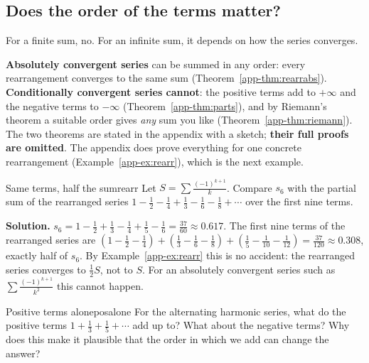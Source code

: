 \documentclass[11pt]{article}
\begin{document}
\subsection*{Does the order of the terms matter?}

For a finite sum, no. For an infinite sum, it depends on how the series converges.

\begin{remark}
\textbf{Absolutely convergent series} can be summed in any order: every rearrangement converges to the same sum (Theorem~\ref{app-thm:rearrabs}). \textbf{Conditionally convergent series cannot}: the positive terms add to $+\infty$ and the negative terms to $-\infty$ (Theorem~\ref{app-thm:parts}), and by Riemann's theorem a suitable order gives \emph{any} sum you like (Theorem~\ref{app-thm:riemann}). The two theorems are stated in the appendix with a sketch; \textbf{their full proofs are omitted}. The appendix does prove everything for one concrete rearrangement (Example~\ref{app-ex:rearr}), which is the next example.
\end{remark}

\begin{exmp}{Same terms, half the sum}{rearr}
Let $S=\sum\frac{(-1)^{k+1}}k$. Compare $s_6$ with the partial sum of the rearranged series $1-\frac12-\frac14+\frac13-\frac16-\frac18+\cdots$ over the first nine terms.

\textbf{Solution.} $s_6=1-\frac12+\frac13-\frac14+\frac15-\frac16=\frac{37}{60}\approx0.617$. The first nine terms of the rearranged series are $(1-\frac12-\frac14)+(\frac13-\frac16-\frac18)+(\frac15-\frac1{10}-\frac1{12})=\frac{37}{120}\approx0.308$, exactly half of $s_6$. By Example~\ref{app-ex:rearr} this is no accident: the rearranged series converges to $\frac12S$, not to $S$. For an absolutely convergent series such as $\sum\frac{(-1)^{k+1}}{k^2}$ this cannot happen.
\end{exmp}

\begin{think}{Positive terms alone}{posalone}
For the alternating harmonic series, what do the positive terms $1+\frac13+\frac15+\cdots$ add up to? What about the negative terms? Why does this make it plausible that the order in which we add can change the answer?
\end{think}
\end{document}
